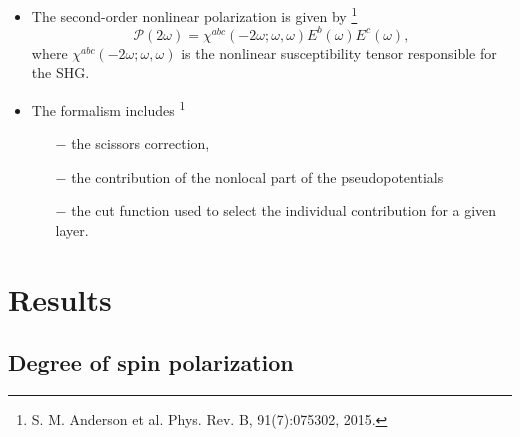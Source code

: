 \documentclass{beamer}
\begin{document}
\begin{frame}


{\small

\begin{itemize}

\item 
The second-order nonlinear polarization is given by
\footnote[frame]{\tiny S. M. Anderson et al. Phys. Rev. B, 91(7):075302, 2015.}
\begin{equation*}\label{eq:pol}
\mathcal{P}(2\omega) = 
\chi^{abc}(-2\omega;\omega,\omega)E^{b}(\omega)E^{c}(\omega),
\end{equation*} 
where $\chi^{abc}(-2\omega;\omega,\omega)$ is the nonlinear susceptibility
tensor responsible for the SHG.

\item 
The formalism includes\textsuperscript{ 1}
\begin{itemize}
\item [$-$] the scissors correction,
\item [$-$] the contribution of the nonlocal part of the pseudopotentials
\item [$-$] the cut function used to select the individual contribution for
a given layer.
\end{itemize}

\end{itemize}
}
\end{frame}



\section{Results}



\subsection{Degree of spin polarization}


\end{document}
